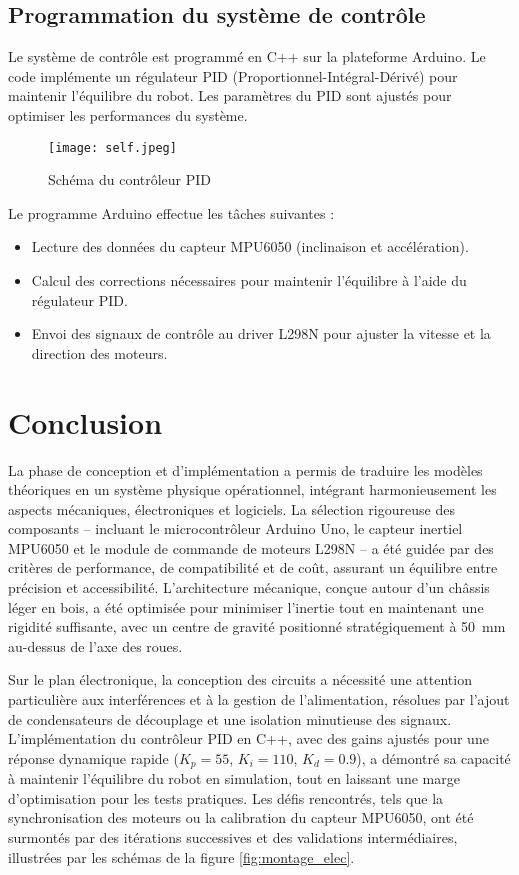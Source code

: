 \documentclass{report}
\begin{document}
\subsection{Programmation du système de contrôle}
Le système de contrôle est programmé en C++ sur la plateforme Arduino. Le code implémente un régulateur PID (Proportionnel-Intégral-Dérivé) pour maintenir l'équilibre du robot. Les paramètres du PID sont ajustés pour optimiser les performances du système.

\begin{figure}[h!]
    \centering
    \texttt{[image: self.jpeg]} %
    \caption{Schéma du contrôleur PID}
    \label{fig:pid_control}
\end{figure}

Le programme Arduino effectue les tâches suivantes :
\begin{itemize}
    \item Lecture des données du capteur MPU6050 (inclinaison et accélération).
    \item Calcul des corrections nécessaires pour maintenir l'équilibre à l'aide du régulateur PID.
    \item Envoi des signaux de contrôle au driver L298N pour ajuster la vitesse et la direction des moteurs.
\end{itemize}
\section*{Conclusion}

La phase de conception et d’implémentation a permis de traduire les modèles théoriques en un système physique opérationnel, intégrant harmonieusement les aspects mécaniques, électroniques et logiciels. La sélection rigoureuse des composants – incluant le microcontrôleur Arduino Uno, le capteur inertiel MPU6050 et le module de commande de moteurs L298N – a été guidée par des critères de performance, de compatibilité et de coût, assurant un équilibre entre précision et accessibilité. L’architecture mécanique, conçue autour d’un châssis léger en bois, a été optimisée pour minimiser l’inertie tout en maintenant une rigidité suffisante, avec un centre de gravité positionné stratégiquement à \SI{50}{mm} au-dessus de l’axe des roues. 

Sur le plan électronique, la conception des circuits a nécessité une attention particulière aux interférences et à la gestion de l’alimentation, résolues par l’ajout de condensateurs de découplage et une isolation minutieuse des signaux. L’implémentation du contrôleur PID en C++, avec des gains ajustés pour une réponse dynamique rapide (\(K_p = 55\), \(K_i = 110\), \(K_d = 0.9\)), a démontré sa capacité à maintenir l’équilibre du robot en simulation, tout en laissant une marge d’optimisation pour les tests pratiques. Les défis rencontrés, tels que la synchronisation des moteurs ou la calibration du capteur MPU6050, ont été surmontés par des itérations successives et des validations intermédiaires, illustrées par les schémas de la figure \ref{fig:montage_elec}.
\end{document}
